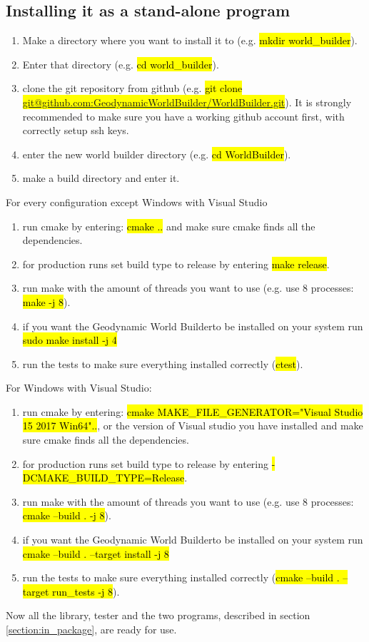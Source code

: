 \documentclass{book}
\newcommand{\GWB}{{Geodynamic World Builder}}
\begin{document}
\subsection{Installing it as a stand-alone program}
\label{subsection:install_stand_aline}
\begin{enumerate}
    \item Make a directory where you want to install it to (e.g. \hl{mkdir world\_builder}).
    \item Enter that directory (e.g. \hl{cd world\_builder}).
    \item clone the git repository from github (e.g. \hl{git clone  \\ \hbox{\url{ git@github.com:GeodynamicWorldBuilder/WorldBuilder.git}}}). It is strongly recommended to make sure you have a working github account first, with correctly setup ssh keys.
    \item enter the new world builder directory (e.g. \hl{cd WorldBuilder}).
    \item make a build directory and enter it.
\end{enumerate}
For every configuration except Windows with Visual Studio
\begin{enumerate}
    \item run cmake by entering: \hl{cmake ..} and make sure cmake finds all the dependencies.
    \item for production runs set build type to release by entering \hl{make release}.
    \item run make with the amount of threads you want to use (e.g. use 8 processes: \hl{make -j 8}).
    \item if you want the \GWB to be installed on your system run \hl{sudo make install -j 4}
    \item run the tests to make sure everything installed correctly (\hl{ctest}).
\end{enumerate}
For Windows with Visual Studio:
\begin{enumerate}
    \item run cmake by entering: \hl{cmake MAKE\_FILE\_GENERATOR="Visual Studio 15 2017 Win64"..}, or the version of Visual studio you have installed and make sure cmake finds all the dependencies.
    \item for production runs set build type to release by entering \hl{-DCMAKE\_BUILD\_TYPE=Release}.
    \item run make with the amount of threads you want to use (e.g. use 8 processes: \hl{cmake --build . -j 8}).
    \item if you want the \GWB to be installed on your system run \hl{cmake --build . --target install -j 8}
    \item run the tests to make sure everything installed correctly (\hl{cmake --build . --target run\_tests -j 8}).
\end{enumerate}
Now all the library, tester and the two programs, described in section \ref{section:in_package}, are ready for use.
\end{document}
